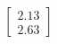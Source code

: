 \documentclass[preview]{standalone}
\begin{document}
\begin{align*}
\begin{bmatrix} 2.13 \\ 2.63 \end{bmatrix}
\end{align*}
\end{document}

